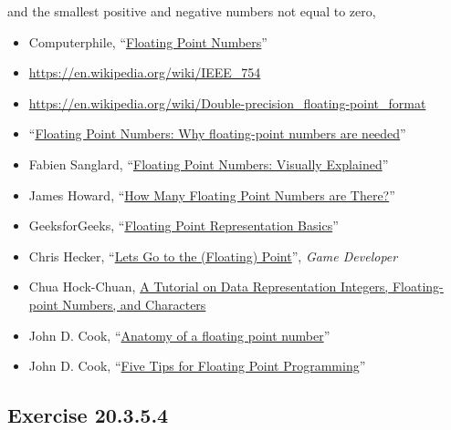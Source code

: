 \documentclass[]{book}
\newenvironment{Shaded}{\begin{snugshade}}{\end{snugshade}}
\newcommand{\CommentTok}[1]{\textcolor[rgb]{0.56,0.35,0.01}{\textit{#1}}}
\newcommand{\NormalTok}[1]{#1}
\newcommand{\OperatorTok}[1]{\textcolor[rgb]{0.81,0.36,0.00}{\textbf{#1}}}
\providecommand{\tightlist}{%
  \setlength{\itemsep}{0pt}\setlength{\parskip}{0pt}}
\theoremstyle{plain}
\theoremstyle{remark}
\begin{document}
and the smallest positive and negative numbers not equal to zero,

\begin{Shaded}
\end{Shaded}

\begin{itemize}
\tightlist
\item
  Computerphile, ``\href{https://www.youtube.com/watch?v=PZRI1IfStY0}{Floating Point Numbers}''
\item
  \url{https://en.wikipedia.org/wiki/IEEE_754}
\item
  \url{https://en.wikipedia.org/wiki/Double-precision_floating-point_format}
\item
  ``\href{https://floating-point-gui.de/formats/fp/}{Floating Point Numbers: Why floating-point numbers are needed}''
\item
  Fabien Sanglard, ``\href{http://fabiensanglard.net/floating_point_visually_explained/}{Floating Point Numbers: Visually Explained}''
\item
  James Howard, ``\href{https://jameshoward.us/2015/09/09/how-many-floating-point-numbers-are-there/}{How Many Floating Point Numbers are There?}''
\item
  GeeksforGeeks, ``\href{https://www.geeksforgeeks.org/floating-point-representation-basics/}{Floating Point Representation Basics}''
\item
  Chris Hecker, ``\href{http://chrishecker.com/images/f/fb/Gdmfp.pdf}{Lets Go to the (Floating) Point}'', \emph{Game Developer}
\item
  Chua Hock-Chuan, \href{http://www.ntu.edu.sg/home/ehchua/programming/java/datarepresentation.html}{A Tutorial on Data Representation Integers, Floating-point Numbers, and Characters}
\item
  John D. Cook, ``\href{https://www.johndcook.com/blog/2009/04/06/anatomy-of-a-floating-point-number/}{Anatomy of a floating point number}''
\item
  John D. Cook, ``\href{https://www.codeproject.com/Articles/29637/Five-Tips-for-Floating-Point-Programming}{Five Tips for Floating Point Programming}''
\end{itemize}

\hypertarget{exercise-20.3.5.4}{%
\subsection*{\texorpdfstring{Exercise {20.3.5.4}}{Exercise 20.3.5.4}}\label{exercise-20.3.5.4}}
\end{document}
